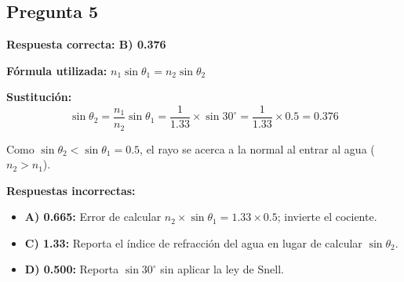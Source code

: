 \begin{respuestabox}
\subsection*{Pregunta 5}
\textcolor{verdecorrecto}{\textbf{Respuesta correcta: B) 0.376}}

\textbf{Fórmula utilizada:} $n_1\sin\theta_1 = n_2\sin\theta_2$

\textbf{Sustitución:}
$$\sin\theta_2 = \frac{n_1}{n_2}\sin\theta_1 = \frac{1}{1.33} \times \sin 30^\circ = \frac{1}{1.33} \times 0.5 = 0.376$$

Como $\sin\theta_2 < \sin\theta_1 = 0.5$, el rayo se acerca a la normal al entrar al agua ($n_2 > n_1$). \checkmark

\textbf{Respuestas incorrectas:}
\begin{itemize}
    \item \textbf{A) 0.665:} Error de calcular $n_2 \times \sin\theta_1 = 1.33 \times 0.5$; invierte el cociente.
    \item \textbf{C) 1.33:} Reporta el índice de refracción del agua en lugar de calcular $\sin\theta_2$.
    \item \textbf{D) 0.500:} Reporta $\sin 30^\circ$ sin aplicar la ley de Snell.
\end{itemize}
\end{respuestabox}

